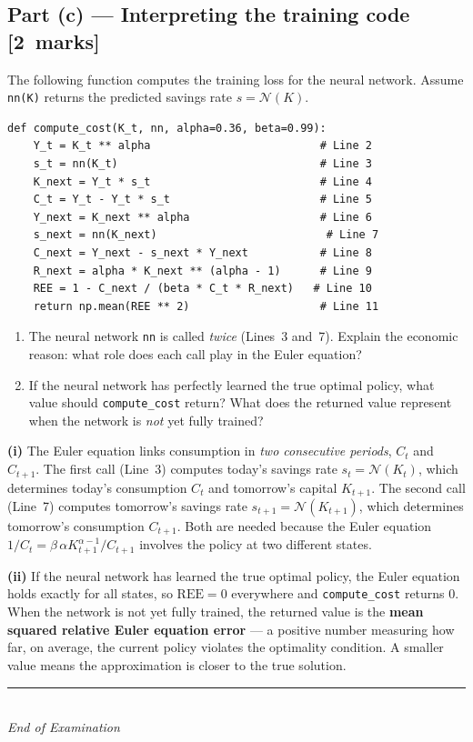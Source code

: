 \documentclass[11pt,a4paper]{article}
\newcommand{\mkpts}[1]{\hfill\textbf{[#1~marks]}}
\begin{document}
\subsection*{Part (c) --- Interpreting the training code \mkpts{2}}

The following function computes the training loss for the neural network.  Assume \texttt{nn(K)} returns the predicted savings rate $s = \mathcal{N}(K)$.

\begin{lstlisting}
def compute_cost(K_t, nn, alpha=0.36, beta=0.99):
    Y_t = K_t ** alpha                          # Line 2
    s_t = nn(K_t)                               # Line 3
    K_next = Y_t * s_t                          # Line 4
    C_t = Y_t - Y_t * s_t                       # Line 5
    Y_next = K_next ** alpha                    # Line 6
    s_next = nn(K_next)                          # Line 7
    C_next = Y_next - s_next * Y_next           # Line 8
    R_next = alpha * K_next ** (alpha - 1)      # Line 9
    REE = 1 - C_next / (beta * C_t * R_next)   # Line 10
    return np.mean(REE ** 2)                    # Line 11
\end{lstlisting}

\begin{enumerate}[label=(\roman*),nosep]
\item The neural network \texttt{nn} is called \emph{twice} (Lines~3 and~7).  Explain the economic reason: what role does each call play in the Euler equation?
\item If the neural network has perfectly learned the true optimal policy, what value should \texttt{compute\_cost} return?  What does the returned value represent when the network is \emph{not} yet fully trained?
\end{enumerate}

\begin{solution}
\textbf{(i)} The Euler equation links consumption in \emph{two consecutive periods}, $C_t$ and $C_{t+1}$.  The first call (Line~3) computes today's savings rate $s_t = \mathcal{N}(K_t)$, which determines today's consumption $C_t$ and tomorrow's capital $K_{t+1}$.  The second call (Line~7) computes tomorrow's savings rate $s_{t+1} = \mathcal{N}(K_{t+1})$, which determines tomorrow's consumption $C_{t+1}$.  Both are needed because the Euler equation $1/C_t = \beta\,\alpha K_{t+1}^{\alpha-1}/C_{t+1}$ involves the policy at two different states.

\medskip

\textbf{(ii)} If the neural network has learned the true optimal policy, the Euler equation holds exactly for all states, so $\text{REE} = 0$ everywhere and \texttt{compute\_cost} returns $\boxed{0}$.  When the network is not yet fully trained, the returned value is the \textbf{mean squared relative Euler equation error} --- a positive number measuring how far, on average, the current policy violates the optimality condition.  A smaller value means the approximation is closer to the true solution.
\end{solution}


\vfill
\begin{center}
\rule{0.5\textwidth}{0.4pt}\\[4pt]
\textit{End of Examination}
\end{center}
\end{document}
